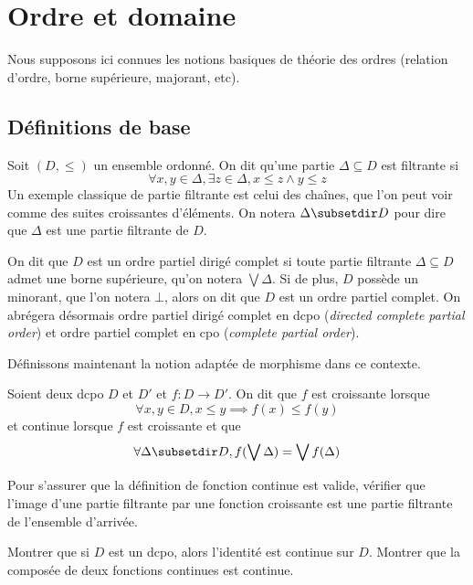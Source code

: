 \section{Ordre et domaine}

Nous supposons ici connues les notions basiques de théorie des ordres (relation d'ordre, borne supérieure, majorant, etc).

\subsection{Définitions de base}

\begin{defi}
    Soit $(D,\leq)$ un ensemble ordonné. On dit qu'une partie $\Delta\subseteq D$ est filtrante si $$\forall x,y\in\Delta,\exists z\in\Delta, x\leq z\land y\leq z$$ Un exemple classique de partie filtrante est celui des chaînes, que l'on peut voir comme des suites croissantes d'éléments. On notera $\Delta\subsetdir D$ pour dire que $\Delta$ est une partie filtrante de $D$.
    
    On dit que $D$ est un ordre partiel dirigé complet si toute partie filtrante $\Delta\subseteq D$ admet une borne supérieure, qu'on notera $\bigvee\Delta$. Si de plus, $D$ possède un minorant, que l'on notera $\bot$, alors on dit que $D$ est un ordre partiel complet. On abrégera désormais \og ordre partiel dirigé complet\fg{} en dcpo (\textit{directed complete partial order}) et \og ordre partiel complet\fg{} en cpo (\textit{complete partial order}).
\end{defi}

Définissons maintenant la notion adaptée de morphisme dans ce contexte.

\begin{defi}
    Soient deux dcpo $D$ et $D'$ et $f : D\to D'$. On dit que $f$ est croissante lorsque $$\forall x,y\in D, x\leq y\implies f(x)\leq f(y)$$ et continue lorsque $f$ est croissante et que $$\forall \Delta\subsetdir D, f(\bigvee\Delta)=\bigvee f(\Delta)$$
\end{defi}

\begin{exo}
    Pour s'assurer que la définition de fonction continue est valide, vérifier que l'image d'une partie filtrante par une fonction croissante est une partie filtrante de l'ensemble d'arrivée.
\end{exo}

\begin{exo}
    Montrer que si $D$ est un dcpo, alors l'identité est continue sur $D$. Montrer que la composée de deux fonctions continues est continue.
\end{exo}

